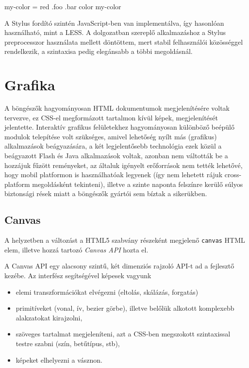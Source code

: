 \begin{css}
my-color = red
.foo
  .bar
    color my-color
\end{css}

A Stylus fordító szintén JavaScript-ben van implementálva, így hasonlóan
használható, mint a LESS.  A dolgozatban szereplő alkalmazáshoz a Stylus
preprocesszor használata mellett döntöttem, mert stabil felhasználói közösséggel
rendelkezik, a szintaxisa pedig elegánsabb a többi megoldásnál.

\section{Grafika}

A böngészők hagyományosan HTML dokumentumok megjelenítésére voltak tervezve, ez
CSS-el megformázott tartalmon kívül képek, megjelenítését jelentette. Interaktív
grafikus felületekhez hagyományosan különböző beépülő modulok telepítése volt
szükséges, amivel lehetőség nyílt más (grafikus) alkalmazások beágyazására, a
két legjelentősebb technológia ezek közül a beágyazott Flash és Java
alkalmazások voltak, azonban nem váltották be a hozzájuk fűzött reményeket,
az általuk igényelt erőforrások nem tették lehetővé, hogy mobil platformon is
használhatóak legyenek (így nem lehetett rájuk cross-platform megoldásként
tekinteni), illetve a szinte naponta felszínre kerülő súlyos biztonsági rések
miatt a böngészők gyártói sem bíztak a sikerükben.

\subsection{Canvas}

A helyzetben a változást a HTML5 szabvány részeként megjelenő \texttt{canvas}
HTML elem, illetve hozzá tartozó \emph{Canvas API} hozta el\cite{canvas}.

A Canvas API egy alacsony szintű, két dimenziós rajzoló API-t ad a fejlesztő
kezébe. Az interfész segítségével képesek vagyunk

\begin{itemize}
  \item elemi transzformációkat elvégezni (eltolás, skálázás, forgatás)
  \item primitíveket (vonal, ív, bezier görbe), illetve belőlük alkotott
    komplexebb alakzatokat kirajzolni,
  \item szöveges tartalmat megjeleníteni, azt a CSS-ben megszokott szintaxissal
    testre szabni (szín, betűtípus, stb),
  \item képeket elhelyezni a vásznon.
\end{itemize}

